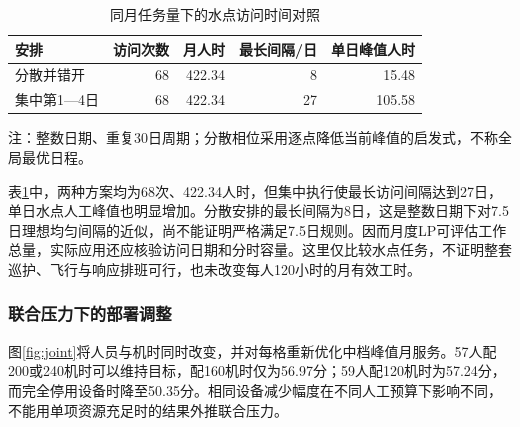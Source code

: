 \documentclass[UTF8,fontset=fandol,12pt,a4paper]{ctexart}
\begin{document}
\begin{table}[htbp]
\centering\small
\caption{同月任务量下的水点访问时间对照}
\label{tab:schedule}
\begin{tabular}{lrrrr}
\toprule
安排 & 访问次数 & 月人时 & 最长间隔/日 & 单日峰值人时 \\
\midrule
分散并错开 & 68 & 422.34 & 8 & 15.48 \\
集中第1—4日 & 68 & 422.34 & 27 & 105.58 \\
\bottomrule
\end{tabular}
\par\smallskip\begin{minipage}{\linewidth}\footnotesize 注：整数日期、重复30日周期；分散相位采用逐点降低当前峰值的启发式，不称全局最优日程。\end{minipage}
\end{table}

表\ref{tab:schedule}中，两种方案均为68次、422.34人时，但集中执行使最长访问间隔达到27日，单日水点人工峰值也明显增加。分散安排的最长间隔为8日，这是整数日期下对7.5日理想均匀间隔的近似，尚不能证明严格满足7.5日规则。因而月度LP可评估工作总量，实际应用还应核验访问日期和分时容量。这里仅比较水点任务，不证明整套巡护、飞行与响应排班可行，也未改变每人120小时的月有效工时。

\subsubsection{联合压力下的部署调整}

图\ref{fig:joint}将人员与机时同时改变，并对每格重新优化中档峰值月服务。57人配200或240机时可以维持目标，配160机时仅为56.97分；59人配120机时为57.24分，而完全停用设备时降至50.35分。相同设备减少幅度在不同人工预算下影响不同，不能用单项资源充足时的结果外推联合压力。
\end{document}
